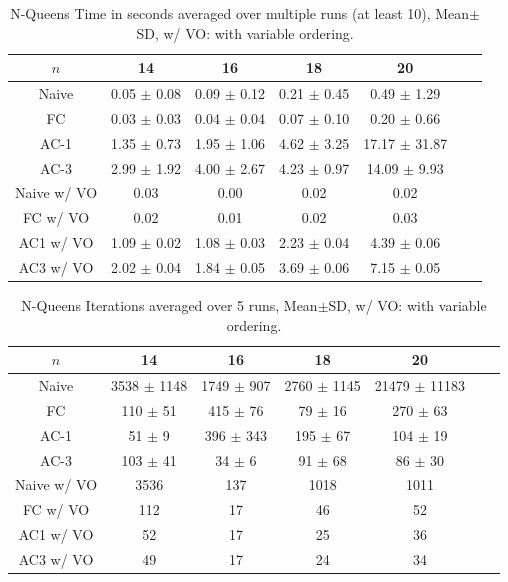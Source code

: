 \begin{table}[h!]
	\centering
	\begin{tabular}{|c|c|c|c|c|c|c|}
		\hline
		$n$         & 14              & 16              & 18              & 20                \\ \hline
		Naive       & 0.05 $\pm$ 0.08 & 0.09 $\pm$ 0.12 & 0.21 $\pm$ 0.45 & 0.49 $\pm$ 1.29   \\ \hline
		FC          & 0.03 $\pm$ 0.03 & 0.04 $\pm$ 0.04 & 0.07 $\pm$ 0.10 & 0.20 $\pm$ 0.66   \\ \hline
		AC-1        & 1.35 $\pm$ 0.73 & 1.95 $\pm$ 1.06 & 4.62 $\pm$ 3.25 & 17.17 $\pm$ 31.87 \\ \hline
		AC-3        & 2.99 $\pm$ 1.92 & 4.00 $\pm$ 2.67 & 4.23 $\pm$ 0.97 & 14.09 $\pm$ 9.93  \\ \hline
		Naive w/ VO & 0.03            & 0.00            & 0.02            & 0.02              \\ \hline
		FC w/ VO    & 0.02            & 0.01            & 0.02            & 0.03              \\ \hline
		AC1 w/ VO   & 1.09 $\pm$ 0.02 & 1.08 $\pm$ 0.03 & 2.23 $\pm$ 0.04 & 4.39 $\pm$ 0.06   \\ \hline
		AC3 w/ VO   & 2.02 $\pm$ 0.04 & 1.84 $\pm$ 0.05 & 3.69 $\pm$ 0.06 & 7.15 $\pm$ 0.05   \\ \hline
	\end{tabular}
	\caption{N-Queens Time in seconds averaged over multiple runs (at least 10), Mean$\pm$SD, w/ VO: with variable ordering.}
	\label{tab:queens:time}
\end{table}

\begin{table}[h!]
	\centering
	\begin{tabular}{|c|c|c|c|c|c|c|}
		\hline
		$n$         & 14              & 16             & 18              & 20                \\ \hline
		Naive       & 3538 $\pm$ 1148 & 1749 $\pm$ 907 & 2760 $\pm$ 1145 & 21479 $\pm$ 11183 \\ \hline
		FC          & 110 $\pm$ 51    & 415 $\pm$ 76   & 79 $\pm$ 16     & 270 $\pm$ 63      \\ \hline
		AC-1        & 51 $\pm$ 9      & 396 $\pm$ 343  & 195 $\pm$ 67    & 104 $\pm$ 19      \\ \hline
		AC-3        & 103 $\pm$ 41    & 34 $\pm$ 6     & 91 $\pm$ 68     & 86 $\pm$ 30       \\ \hline
		Naive w/ VO & 3536            & 137            & 1018            & 1011              \\ \hline
		FC w/ VO    & 112             & 17             & 46              & 52                \\ \hline
		AC1 w/ VO   & 52              & 17             & 25              & 36                \\ \hline
		AC3 w/ VO   & 49              & 17             & 24              & 34                \\ \hline
	\end{tabular}
	\caption{N-Queens Iterations averaged over 5 runs, Mean$\pm$SD, w/ VO: with variable ordering.}
	\label{tab:queens:iterations}
\end{table}

